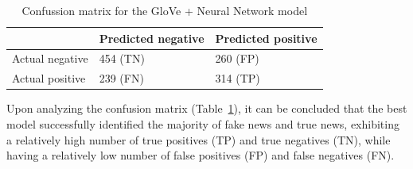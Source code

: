 \begin{table}[htb]
\centering
{
\makegapedcells
\begin{tabular}{lll}
                & Predicted negative & Predicted positive \\
\hline
Actual negative & 454 (TN)           & 260 (FP) \\
Actual positive & 239 (FN)           & 314 (TP) \\
\hline
\end{tabular}
}
\caption{Confussion matrix for the GloVe + Neural Network model}
\label{glovenn_cm}
\end{table}

Upon analyzing the confusion matrix (Table~\ref{glovenn_cm}), it can be concluded that the best model successfully identified the majority of fake news and true news, exhibiting a relatively high number of true positives (TP) and true negatives (TN), while having a relatively low number of false positives (FP) and false negatives (FN).

